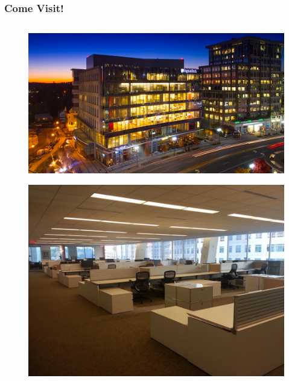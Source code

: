 \documentclass[compress]{beamer}
\begin{document}
    \begin{frame}[Blank] \frametitle{Come Visit!}
        \begin{columns}
            \begin{column}{0.35\textwidth}
                \begin{figure}
                    \centering
                    \includegraphics[width=1\linewidth]{../figures/metro-lab-big-data-sdal-header}
                    \caption{}
                    \label{fig:metro-lab-big-data-sdal-header}
                \end{figure}

                \begin{figure}
                    \centering
                    \includegraphics[width=1\linewidth]{../figures/sdal_pit}
                    \caption{}
                    \label{fig:sdalpit}
                \end{figure}
            \end{column}


\end{columns}
\end{frame}
\end{document}
